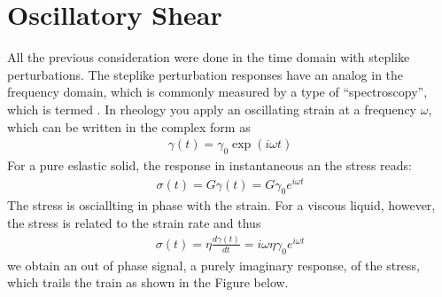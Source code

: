\documentclass[letterpaper,10pt,english]{sphinxmanual}
\begin{document}
\section{Oscillatory Shear}
\label{\detokenize{notebooks/L24/1_Viscoelasticity:Oscillatory-Shear}}
\sphinxAtStartPar
All the previous consideration were done in the time domain with step\sphinxhyphen{}like perturbations. The step\sphinxhyphen{}like perturbation responses have an analog in the frequency domain, which is commonly measured by a type of “spectroscopy”, which is termed . In rheology you apply an oscillating strain at a frequency \(\omega\), which can be written in the complex form as
\begin{equation*}
\begin{split}\gamma(t)=\gamma_0 \exp(i\omega t)\end{split}
\end{equation*}
\sphinxAtStartPar
For a pure eslastic solid, the response in instantaneous an the stress reads:
\begin{equation*}
\begin{split}\sigma(t)=G \gamma(t)=G \gamma_{0} e^{i \omega t}\end{split}
\end{equation*}
\sphinxAtStartPar
The stress is osciallting in phase with the strain. For a viscous liquid, however, the stress is related to the strain rate and thus
\begin{equation*}
\begin{split}\sigma(t)=\eta \frac{d \gamma(t)}{d t}=i \omega \eta \gamma_{0} e^{i \omega t}\end{split}
\end{equation*}
\sphinxAtStartPar
we obtain an out of phase signal, a purely imaginary response, of the stress, which trails the train as shown in the Figure below.

\noindent{}
\end{document}
